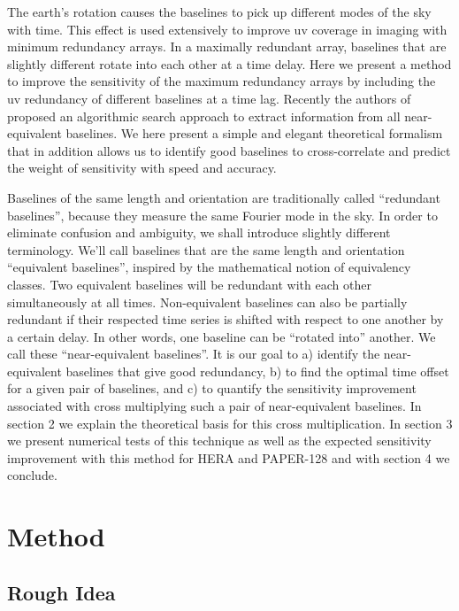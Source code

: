 \documentclass[preprint2,numberedappendix,tighten,twocolappendix]{aastex6}  %
\renewcommand\[{\begin{equation}}
\renewcommand\]{\end{equation}}
\begin{document}
The earth's rotation causes the baselines to pick up different modes of the sky with time. 
This effect is used extensively to improve uv coverage in imaging with minimum redundancy arrays. In
a maximally redundant array, baselines that are slightly different
rotate into each other at a time delay. Here we present a method to
improve the sensitivity of the maximum redundancy arrays by including
the uv redundancy of different baselines at a time lag. Recently the authors of \cite{wterm} proposed an algorithmic search approach to extract information from all near-equivalent baselines. We here present a simple and elegant theoretical formalism that in addition allows us to identify good baselines to cross-correlate and predict the weight of sensitivity with speed and accuracy. 

Baselines of the same length and orientation are traditionally called
``redundant baselines'', because they measure the same Fourier mode
in the sky. In order to eliminate confusion and ambiguity, we shall
introduce slightly different terminology. We'll call baselines that
are the same length and orientation ``equivalent baselines'', inspired
by the mathematical notion of equivalency classes. Two equivalent
baselines will be redundant with each other simultaneously at all
times. Non-equivalent baselines can also be partially redundant if their
respected time series is shifted with respect to one another by a
certain delay. In other words, one baseline can be ``rotated into''
another. We call these ``near-equivalent baselines''. It is our
goal to a) identify the near-equivalent baselines that give good
redundancy, b) to find the optimal time offset for a given pair of baselines, and
c) to quantify the sensitivity improvement associated with cross multiplying
such a pair of near-equivalent baselines. In section
2 we explain the theoretical basis for this cross multiplication.
In section 3 we present numerical tests of
this technique as well as the expected sensitivity improvement
with this method for HERA and PAPER-128 and with section 4 we conclude. 


\section{Method}

\subsection{Rough Idea}
\end{document}
